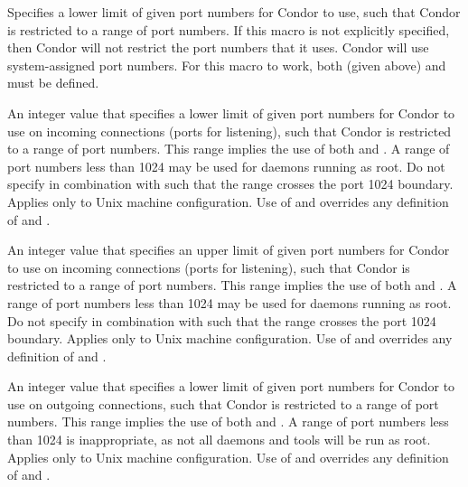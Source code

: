 \begin{description}
\label{param:LowPort}
\item[\Macro{LOWPORT}]
  Specifies a lower limit of given port numbers for Condor to use,
  such that Condor is restricted to a range of port numbers.
  If this macro is not explicitly specified, then Condor will
  not restrict the port numbers that it uses. Condor will use
  system-assigned port numbers.
  For this macro to work, both  (given above) and
   must be defined.

\label{param:InLowPort}
\item[\Macro{IN\_LOWPORT}]
  An integer value that specifies a lower limit of given port numbers
  for Condor to use on incoming connections (ports for listening),
  such that Condor is restricted to a range of port numbers.
  This range implies the use of both  and
  .
  A range of port numbers less than 1024 may be used for daemons 
  running as root.
  Do not specify  in combination with 
   such that the range crosses the port 1024
  boundary.
  Applies only to Unix machine configuration.
  Use of  and  overrides
  any definition of  and .

\label{param:InHighPort}
\item[\Macro{IN\_HIGHPORT}]
  An integer value that specifies an upper limit of given port numbers
  for Condor to use on incoming connections (ports for listening),
  such that Condor is restricted to a range of port numbers.
  This range implies the use of both  and
  .
  A range of port numbers less than 1024 may be used for daemons 
  running as root.
  Do not specify  in combination with 
   such that the range crosses the port 1024
  boundary.
  Applies only to Unix machine configuration.
  Use of  and  overrides
  any definition of  and .

\label{param:OutLowPort}
\item[\Macro{OUT\_LOWPORT}]
  An integer value that specifies a lower limit of given port numbers
  for Condor to use on outgoing connections,
  such that Condor is restricted to a range of port numbers.
  This range implies the use of both  and
  .
  A range of port numbers less than 1024 is inappropriate, as
  not all daemons and tools will be run as root.
  Applies only to Unix machine configuration.
  Use of  and  overrides
  any definition of  and .


\end{description}
